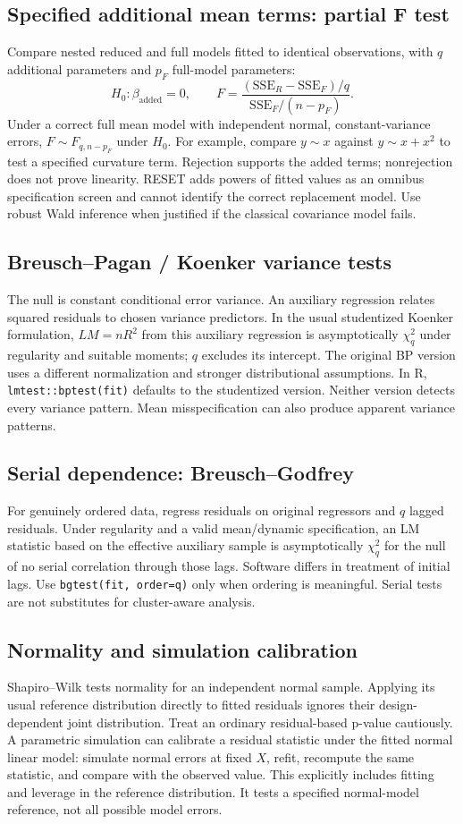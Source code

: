 \documentclass[11pt]{article}
\begin{document}
\subsection{Specified additional mean terms: partial F test}
Compare nested reduced and full models fitted to identical observations, with $q$ additional parameters and $p_F$ full-model parameters:
\[H_0:\beta_{\mathrm{added}}=0,\qquad F=\frac{(\mathrm{SSE}_R-\mathrm{SSE}_F)/q}{\mathrm{SSE}_F/(n-p_F)}.\]
Under a correct full mean model with independent normal, constant-variance errors, $F\sim F_{q,n-p_F}$ under $H_0$. For example, compare $y\sim x$ against $y\sim x+x^2$ to test a specified curvature term. Rejection supports the added terms; nonrejection does not prove linearity. RESET adds powers of fitted values as an omnibus specification screen and cannot identify the correct replacement model. Use robust Wald inference when justified if the classical covariance model fails.
\subsection{Breusch--Pagan / Koenker variance tests}
The null is constant conditional error variance. An auxiliary regression relates squared residuals to chosen variance predictors. In the usual studentized Koenker formulation, $LM=nR^2$ from this auxiliary regression is asymptotically $\chi_q^2$ under regularity and suitable moments; $q$ excludes its intercept. The original BP version uses a different normalization and stronger distributional assumptions. In R, \texttt{lmtest::bptest(fit)} defaults to the studentized version. Neither version detects every variance pattern. Mean misspecification can also produce apparent variance patterns.
\subsection{Serial dependence: Breusch--Godfrey}
For genuinely ordered data, regress residuals on original regressors and $q$ lagged residuals. Under regularity and a valid mean/dynamic specification, an LM statistic based on the effective auxiliary sample is asymptotically $\chi_q^2$ for the null of no serial correlation through those lags. Software differs in treatment of initial lags. Use \texttt{bgtest(fit, order=q)} only when ordering is meaningful. Serial tests are not substitutes for cluster-aware analysis.
\subsection{Normality and simulation calibration}
Shapiro--Wilk tests normality for an independent normal sample. Applying its usual reference distribution directly to fitted residuals ignores their design-dependent joint distribution. Treat an ordinary residual-based p-value cautiously. A parametric simulation can calibrate a residual statistic under the fitted normal linear model: simulate normal errors at fixed $X$, refit, recompute the same statistic, and compare with the observed value. This explicitly includes fitting and leverage in the reference distribution. It tests a specified normal-model reference, not all possible model errors.
\end{document}
